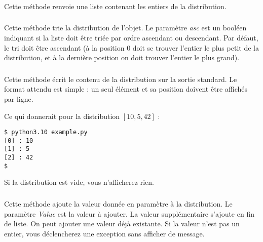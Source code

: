 \subsubsection*{}

\noindent Cette méthode renvoie une liste contenant les entiers de la distribution.


\subsubsection*{}

\noindent Cette méthode trie la distribution de l'objet.
Le paramètre \textit{asc} est un booléen indiquant si la liste doit être triée par ordre ascendant ou descendant.
Par défaut, le tri doit être ascendant (à la position $ 0 $ doit se trouver l'entier le plus petit de la distribution, et à la dernière position on doit trouver l'entier le plus grand).


\subsubsection*{}

\noindent Cette méthode écrit le contenu de la distribution sur la sortie standard.
Le format attendu est simple : un seul élément et sa position doivent être affichés par ligne.

\bigskip

\noindent {}

\bigskip

\noindent Ce qui donnerait pour la distribution $ [ 10, 5, 42 ] $ :

\lstset{language=sh}
\begin{lstlisting}[frame=single]
$ python3.10 example.py
[0] : 10
[1] : 5
[2] : 42
$
\end{lstlisting}

\bigskip

\noindent Si la distribution est vide, vous n'afficherez rien.



\subsubsection*{}

\noindent Cette méthode ajoute la valeur donnée en paramètre à la distribution.
Le paramètre \textit{Value} est la valeur à ajouter.
La valeur supplémentaire s'ajoute en fin de liste.
On peut ajouter une valeur déjà existante.
Si la valeur n'est pas un entier, vous déclencherez une exception  sans afficher de message.

